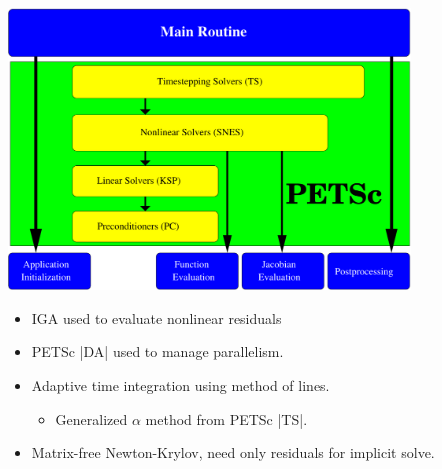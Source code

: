 \begin{frame}
  \includegraphics[width=0.8\textwidth]{figures/SNES/FlowControl}
  \begin{itemize}
  \item IGA used to evaluate nonlinear residuals
  \item PETSc \cverb|DA| used to manage parallelism.
  \item Adaptive time integration using method of lines.
    \begin{itemize}
    \item Generalized $\alpha$ method from PETSc \cverb|TS|.
    \end{itemize}
  \item Matrix-free Newton-Krylov, need only residuals for implicit solve.
  \end{itemize}
\end{frame}



